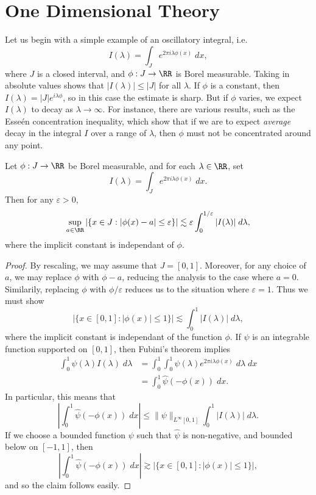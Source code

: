 \section{One Dimensional Theory}

Let us begin with a simple example of an oscillatory integral, i.e.
%
\[ I(\lambda) = \int_J e^{2 \pi i \lambda \phi(x)}\; dx, \]
%
where $J$ is a closed interval, and $\phi: J \to \RR$ is Borel measurable. Taking in absolute values shows that $|I(\lambda)| \leq |J|$ for all $\lambda$. If $\phi$ is a constant, then $I(\lambda) = |J| e^{i \lambda \phi}$, so in this case the estimate is sharp. But if $\phi$ varies, we expect $I(\lambda)$ to decay as $\lambda \to \infty$. For instance, there are various results, such as the Esse\'{e}n concentration inequality, which show that if we are to expect \emph{average} decay in the integral $I$ over a range of $\lambda$, then $\phi$ must not be concentrated around any point.

\begin{theorem}
  Let $\phi: J \to \RR$ be Borel measurable, and for each $\lambda \in \RR$, set
  \[ I(\lambda) = \int_J e^{2 \pi i \lambda \phi(x)}\; dx. \]
  Then for any $\varepsilon > 0$,
  \[ \sup_{a \in \RR} |\{ x \in J: |\phi(x) - a| \leq \varepsilon \}| \lesssim \varepsilon \int_0^{1/\varepsilon} |I(\lambda)|\; d\lambda, \]
  where the implicit constant is independant of $\phi$.
\end{theorem}
\begin{proof}
  By rescaling, we may assume that $J = [0,1]$. Moreover, for any choice of $a$, we may replace $\phi$ with $\phi - a$, reducing the analysis to the case where $a = 0$. Similarily, replacing $\phi$ with $\phi/\varepsilon$ reduces us to the situation where $\varepsilon = 1$. Thus we must show
  \[ |\{ x \in [0,1]: |\phi(x)| \leq 1 \}| \lesssim \int_0^1 |I(\lambda)|\; d\lambda, \]
  where the implicit constant is independant of the function $\phi$. If $\psi$ is an integrable function supported on $[0,1]$, then Fubini's theorem implies
  \begin{align*}
    \int_0^1 \psi(\lambda) I(\lambda)\; d\lambda &= \int_0^1 \int_0^1 \psi(\lambda) e^{2 \pi i \lambda \phi(x)}\; d\lambda\; dx\\
    &= \int_0^1 \widehat{\psi}(- \phi(x))\; dx.
  \end{align*}
  In particular, this means that
  \[ \left| \int_0^1 \widehat{\psi}(- \phi(x))\; dx \right| \leq \| \psi \|_{L^\infty[0,1]} \int_0^1 |I(\lambda)|\; d\lambda. \]
  If we choose a bounded function $\psi$ such that $\widehat{\psi}$ is non-negative, and bounded below on $[-1,1]$, then
  \[ \left| \int_0^1 \widehat{\psi}(- \phi(x))\; dx \right| \gtrsim |\{ x \in [0,1]: |\phi(x)| \leq 1 \}|, \]
  and so the claim follows easily.
\end{proof}

